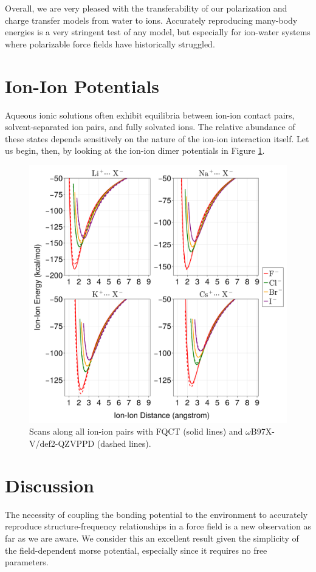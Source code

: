 \documentclass[journal=jctcce,manuscript=article]{achemso}
\begin{document}
Overall, we are very pleased with the transferability of our polarization and charge transfer models from water to ions. Accurately reproducing many-body energies is a very stringent test of any model, but especially for ion-water systems where polarizable force fields have historically struggled.

\section*{Ion-Ion Potentials}

Aqueous ionic solutions often exhibit equilibria between ion-ion contact pairs, solvent-separated ion pairs, and fully solvated ions. The relative abundance of these states depends sensitively on the nature of the ion-ion interaction itself.\cite{roy2017marcus} Let us begin, then, by looking at the ion-ion dimer potentials in Figure \ref{fig:ion_ion_scans}.

\begin{figure}[h]
  \includegraphics*[width=\textwidth]{figures/ion_ion_dimer_scans.png}
  \caption{Scans along all ion-ion pairs with FQCT (solid lines) and $\omega$B97X-V/def2-QZVPPD (dashed lines).
}
  \label{fig:ion_ion_scans}
\end{figure}

\section*{Discussion}
The necessity of coupling the bonding potential to the environment to accurately reproduce structure-frequency relationships in a force field is a new observation as far as we are aware. We consider this an excellent result given the simplicity of the field-dependent morse potential, especially since it requires no free parameters. 
\end{document}
